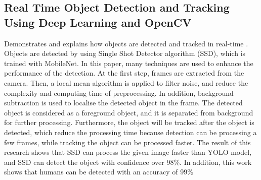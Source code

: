         \subsection{Real Time Object Detection and Tracking Using Deep Learning and OpenCV}
            Demonstrates and explains how objects are detected and tracked in real-time \cite{related-work-1}.
            Objects are detected by using Single Shot Detector algorithm (SSD),
            which is trained with MobileNet.
            In this paper, many techniques are used to enhance the performance of the detection.
            At the first step, frames are extracted from the camera.
            Then, a local mean algorithm is applied to filter noise,
            and reduce the complexity and computing time of preprocessing.
            In addition, background subtraction is used to localise the detected object in the frame.
            The detected object is considered as a foreground object,
            and it is separated from background for further processing.
            Furthermore, the object will be tracked after the object is detected,
            which reduce the processing time because detection can be processing a few frames,
            while tracking the object can be processed faster.
            The result of this research shows that SSD can process the given image faster than YOLO model,
            and SSD can detect the object with confidence over 98\%.
            In addition, this work shows that humans can be detected with an accuracy of 99\%